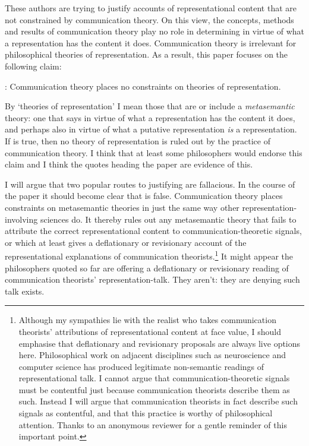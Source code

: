 \documentclass[12pt]{article}
\begin{document}
These authors are trying to justify accounts of representational content that are not constrained by communication theory.
On this view, the concepts, methods and results of communication theory play no role in determining in virtue of what a representation has the content it does.
Communication theory is irrelevant for philosophical theories of representation.
As a result, this paper focuses on the following claim:

\begin{myquote}
\tic{}: Communication theory places no constraints on theories of representation.
\end{myquote}

\noindent By `theories of representation' I mean those that are or include a \textit{metasemantic} theory: one that says in virtue of what a representation has the content it does, and perhaps also in virtue of what a putative representation \textit{is} a representation.
If \tic{} is true, then no theory of representation is ruled out by the practice of communication theory.
I think that at least some philosophers would endorse this claim and I think the quotes heading the paper are evidence of this.

I will argue that two popular routes to justifying \tic{} are fallacious.
In the course of the paper it should become clear that \tic{} is false.
Communication theory places constraints on metasemantic theories in just the same way other representation-involving sciences do.
It thereby rules out any metasemantic theory that fails to attribute the correct representational content to communication-theoretic signals, or which at least gives a deflationary or revisionary account of the representational explanations of communication theorists.\footnote{Although my sympathies lie with the realist who takes communication theorists' attributions of representational content at face value, I should emphasise that deflationary and revisionary proposals are always live options here. Philosophical work on adjacent disciplines such as neuroscience and computer science has produced legitimate non-semantic readings of representational talk. I cannot argue that communication-theoretic signals must be contentful just because communication theorists describe them as such. Instead I will argue that communication theorists in fact describe such signals as contentful, and that this practice is worthy of philosophical attention. Thanks to an anonymous reviewer for a gentle reminder of this important point.}
It might appear the philosophers quoted so far are offering a deflationary or revisionary reading of communication theorists' representation-talk. They aren't: they are denying such talk exists.
\end{document}
